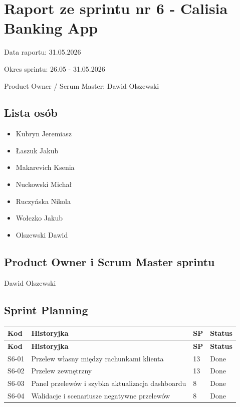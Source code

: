 \documentclass[12pt,a4paper]{article}
\begin{document}
\section*{Raport ze sprintu nr 6 - Calisia Banking App}
Data raportu: 31.05.2026

Okres sprintu: 26.05 - 31.05.2026

Product Owner / Scrum Master: Dawid Olszewski

\subsection*{Lista osób}
\begin{itemize}
\item Kubryn Jeremiasz
\item Łaszuk Jakub
\item Makarevich Ksenia
\item Nuckowski Michał
\item Ruczyńska Nikola
\item Wołczko Jakub
\item Olszewski Dawid
\end{itemize}

\subsection*{Product Owner i Scrum Master sprintu}
Dawid Olszewski

\subsection*{Sprint Planning}
\begingroup
\footnotesize
{}
\begin{longtable}{@{}C{0.08\textwidth}L{0.62\textwidth}C{0.10\textwidth}L{0.12\textwidth}@{}}
\toprule
{}
\textbf{Kod} & \textbf{Historyjka} & \textbf{SP} & \textbf{Status} \\
\midrule
\endfirsthead
\toprule
{}
\textbf{Kod} & \textbf{Historyjka} & \textbf{SP} & \textbf{Status} \\
\midrule
\endhead
S6-01 & Przelew własny między rachunkami klienta & 13 & Done \\
S6-02 & Przelew zewnętrzny & 13 & Done \\
S6-03 & Panel przelewów i szybka aktualizacja dashboardu & 8 & Done \\
S6-04 & Walidacje i scenariusze negatywne przelewów & 8 & Done \\
\bottomrule
\end{longtable}
\endgroup
\end{document}
